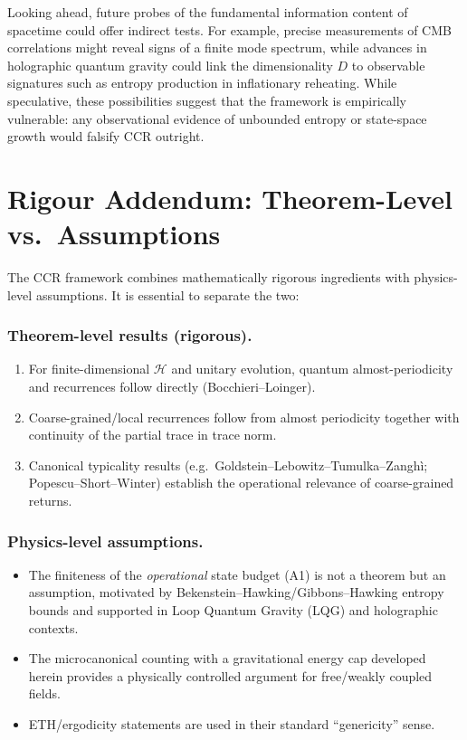 \documentclass[12pt]{article}
\theoremstyle{remark}
\begin{document}
Looking ahead, future probes of the fundamental information content of spacetime
could offer indirect tests. For example, precise measurements of CMB correlations might
reveal signs of a finite mode spectrum, while advances in holographic quantum gravity
could link the dimensionality $D$ to observable signatures such as entropy production in
inflationary reheating. While speculative, these possibilities suggest that the framework
is empirically vulnerable: any observational evidence of unbounded entropy or
state-space growth would falsify CCR outright.


\section{Rigour Addendum: Theorem-Level vs.\ Assumptions}

The CCR framework combines mathematically rigorous ingredients with
physics-level assumptions. It is essential to separate the two:

\subsubsection*{Theorem-level results (rigorous).}
\begin{enumerate}[label=(\roman*)]
  \item For finite-dimensional $\mathcal{H}$ and unitary evolution,
  quantum almost-periodicity and recurrences follow directly 
  (Bocchieri--Loinger).
  \item Coarse-grained/local recurrences follow from almost periodicity
  together with continuity of the partial trace in trace norm.
  \item Canonical typicality results 
  (e.g.\ Goldstein--Lebowitz--Tumulka--Zanghì;
  Popescu--Short--Winter) establish the operational relevance of
  coarse-grained returns.
\end{enumerate}

\subsubsection*{Physics-level assumptions.}
\begin{itemize}
  \item The finiteness of the \emph{operational} state budget (A1) is
  not a theorem but an assumption, motivated by Bekenstein--Hawking/Gibbons--Hawking
  entropy bounds and supported in Loop Quantum Gravity (LQG) and
  holographic contexts.
  \item The microcanonical counting with a gravitational energy cap developed
  herein provides a physically controlled argument for free/weakly coupled fields.
  \item ETH/ergodicity statements are used in their standard “genericity” sense.
\end{itemize}
\end{document}
